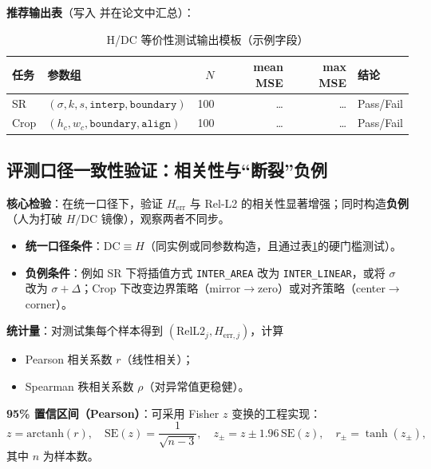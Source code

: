 \textbf{推荐输出表}（写入  并在论文中汇总）：
\begin{table}[h]
\centering
\caption{H/DC 等价性测试输出模板（示例字段）}
\label{tab:dc_equivalence_template_example}
\begin{tabular}{l l r r r l}
\hline
任务 & 参数组 & $N$ & mean MSE & max MSE & 结论 \\
\hline
SR   & $(\sigma, k, s, \texttt{interp}, \texttt{boundary})$  & 100 & \dots & \dots & Pass/Fail \\
Crop & $(h_c, w_c, \texttt{boundary}, \texttt{align})$       & 100 & \dots & \dots & Pass/Fail \\
\hline
\end{tabular}
\end{table}

\subsection{评测口径一致性验证：相关性与“断裂”负例}
\textbf{核心检验}：在统一口径下，验证 $H_{\mathrm{err}}$ 与 Rel-L2 的相关性显著增强；同时构造\textbf{负例}（人为打破 $H/\mathrm{DC}$ 镜像），观察两者不同步。

\begin{itemize}
  \item \textbf{统一口径条件}：$\mathrm{DC}\equiv H$（同实例或同参数构造，且通过表\ref{tab:dc_equivalence_template_example}的硬门槛测试）。
  \item \textbf{负例条件}：例如 SR 下将插值方式 \texttt{INTER\_AREA} 改为 \texttt{INTER\_LINEAR}，或将 $\sigma$ 改为 $\sigma+\Delta$；Crop 下改变边界策略（mirror$\rightarrow$zero）或对齐策略（center$\rightarrow$corner）。
\end{itemize}

\textbf{统计量}：对测试集每个样本得到 $(\mathrm{RelL2}_j, H_{\mathrm{err},j})$，计算
\begin{itemize}
  \item Pearson 相关系数 $r$（线性相关）；
  \item Spearman 秩相关系数 $\rho$（对异常值更稳健）。
\end{itemize}

\textbf{95\% 置信区间（Pearson）}：可采用 Fisher $z$ 变换的工程实现：
\begin{equation}
z=\mathrm{arctanh}(r),\quad
\mathrm{SE}(z)=\frac{1}{\sqrt{n-3}},\quad
z_{\pm}=z\pm 1.96\,\mathrm{SE}(z),\quad
r_{\pm}=\tanh(z_{\pm}),
\end{equation}
其中 $n$ 为样本数。


